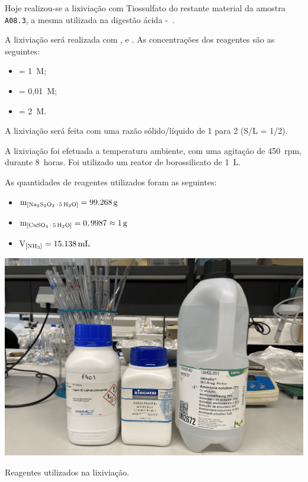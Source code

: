 \pagestyle{fancy}


Hoje realizou-se a lixiviação com Tiossulfato do restante material da amostra \texttt{A08.3}, a mesma utilizada na digestão ácida -~.

A lixiviação será realizada com \TSP{}, \SCP{} e \AMO{}.
As concentrações dos reagentes são as seguintes:
\begin{itemize}
    \item \tsp{} = 1~M\@;
    \item \scp{} = 0,01~M\@;
    \item \amo{} = 2~M\@.
\end{itemize}

A lixiviação será feita com uma razão sólido/líquido de 1 para 2 (S/L = 1/2).

A lixiviação foi efetuada a temperatura ambiente, com uma agitação de 450~rpm, durante 8~horas.
Foi utilizado um reator de borossilicato de 1~L\@.

As quantidades de reagentes utilizados foram as seguintes:
\begin{itemize}
    \item $\mathrm{m}_{\left[ \tsp \right]} = \SI{99,268}{g}$
    \item $\mathrm{m}_{\left[ \scp \right]} = 0,9987 \approx \SI{1}{g}$
    \item $\mathrm{V}_{\left[ \amo \right]} = \SI{15,138}{mL}$
\end{itemize}

\begin{marginfigure}[-4\baselineskip]
    \centering
    \includegraphics[width=\linewidth]{figures/reagentes-lixiviação 1}
    \caption{Reagentes utilizados na lixiviação.}
    \label{fig:reagentes-lixiviacao-1}
\end{marginfigure}

